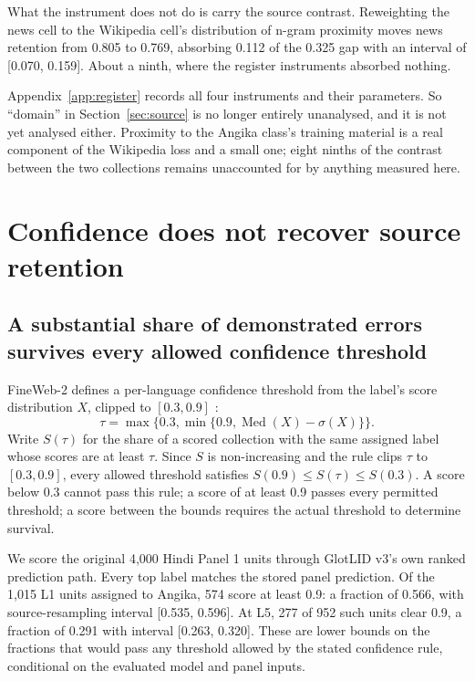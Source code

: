 \documentclass[final]{clv2025}
\begin{document}
What the instrument does not do is carry the source contrast. Reweighting the news cell to the Wikipedia cell's distribution of n-gram proximity moves news retention from 0.805 to 0.769, absorbing 0.112 of the 0.325 gap with an interval of [0.070, 0.159]. About a ninth, where the register instruments absorbed nothing.

Appendix~\ref{app:register} records all four instruments and their parameters. So ``domain'' in Section~\ref{sec:source} is no longer entirely unanalysed, and it is not yet analysed either. Proximity to the Angika class's training material is a real component of the Wikipedia loss and a small one; eight ninths of the contrast between the two collections remains unaccounted for by anything measured here.

\section{Confidence does not recover source retention}\label{sec:confidence}

\subsection{A substantial share of demonstrated errors survives every allowed confidence threshold}

FineWeb-2 defines a per-language confidence threshold from the label's score distribution $X$, clipped to $[0.3,0.9]$ \citep{penedo2025fineweb2}:
\begin{equation}
\tau=\max\{0.3,\min\{0.9,\operatorname{Med}(X)-\sigma(X)\}\}.
\end{equation}
Write $S(\tau)$ for the share of a scored collection with the same assigned label whose scores are at least $\tau$. Since $S$ is non-increasing and the rule clips $\tau$ to $[0.3,0.9]$, every allowed threshold satisfies $S(0.9)\leq S(\tau)\leq S(0.3)$. A score below 0.3 cannot pass this rule; a score of at least 0.9 passes every permitted threshold; a score between the bounds requires the actual threshold to determine survival.

We score the original 4,000 Hindi Panel 1 units through GlotLID v3's own ranked prediction path. Every top label matches the stored panel prediction. Of the 1,015 L1 units assigned to Angika, 574 score at least 0.9: a fraction of 0.566, with source-resampling interval [0.535, 0.596]. At L5, 277 of 952 such units clear 0.9, a fraction of 0.291 with interval [0.263, 0.320]. These are lower bounds on the fractions that would pass any threshold allowed by the stated confidence rule, conditional on the evaluated model and panel inputs.
\end{document}
